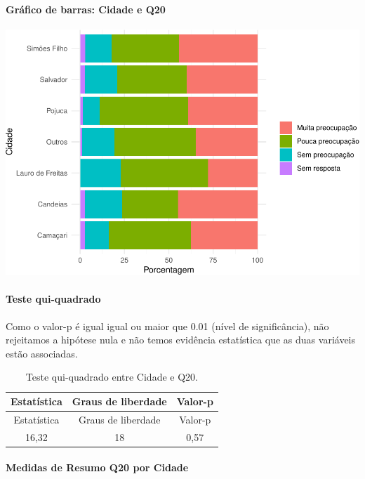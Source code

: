 \documentclass[]{article}
\let\oldparagraph\paragraph
\renewcommand{\paragraph}[1]{\oldparagraph{#1}\mbox{}}
\begin{document}
\hypertarget{gruxe1fico-de-barras-cidade-e-q20}{%
\paragraph{Gráfico de barras: Cidade e Q20}\label{gruxe1fico-de-barras-cidade-e-q20}}

\begin{center}\includegraphics[width=0.75\linewidth]{relatorio_covid19_files/figure-latex/unnamed-chunk-367-1} \end{center}

\hypertarget{teste-qui-quadrado-32}{%
\paragraph{Teste qui-quadrado}\label{teste-qui-quadrado-32}}

Como o valor-p é igual igual ou maior que 0.01 (nível de significância), não rejeitamos a hipótese nula e não temos evidência estatística que as duas variáveis estão associadas.

\begin{longtable}[]{@{}ccc@{}}
\caption{\label{tab:unnamed-chunk-369}Teste qui-quadrado entre Cidade e Q20.}\tabularnewline
\toprule
Estatística & Graus de liberdade & Valor-p\tabularnewline
\midrule
\endfirsthead
\toprule
Estatística & Graus de liberdade & Valor-p\tabularnewline
\midrule
\endhead
16,32 & 18 & 0,57\tabularnewline
\bottomrule
\end{longtable}

\cleardoublepage

\hypertarget{medidas-de-resumo-q20-por-cidade}{%
\paragraph{Medidas de Resumo Q20 por Cidade}\label{medidas-de-resumo-q20-por-cidade}}
\end{document}
